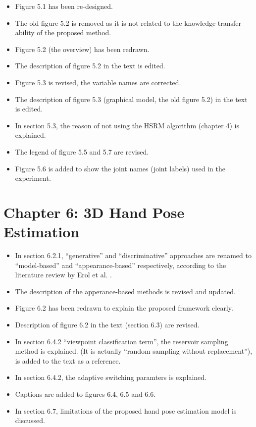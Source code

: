 \documentclass[10pt, a4paper]{article}
\begin{document}
\begin{itemize}
\item Figure 5.1 has been re-designed.
\item The old figure 5.2 is removed as it is not related to the knowledge transfer ability of the proposed method.
\item Figure 5.2 (the overview) has been redrawn.
\item The description of figure 5.2 in the text is edited.
\item Figure 5.3 is revised, the variable names are corrected.
\item The description of figure 5.3 (graphical model, the old figure 5.2) in the text is edited.
\item In section 5.3, the reason of not using the HSRM algorithm (chapter 4) is explained.
\item The legend of figure 5.5 and 5.7 are revised.
\item Figure 5.6 is added to show the joint names (joint labels) used in the experiment.
\end{itemize}

\section{Chapter 6: 3D Hand Pose Estimation} 

\begin{itemize}
\item In section 6.2.1, ``generative'' and ``discriminative'' approaches are renamed to ``model-based'' and ``appearance-based'' respectively, according to the literature review by Erol et al. \cite{Erol2007}.
\item The description of the apperance-based methods is revised and updated.  
\item Figure 6.2 has been redrawn to explain the proposed framework clearly.
\item Description of figure 6.2 in the text (section 6.3) are revised.
\item In section 6.4.2 ``viewpoint classification term'', the reservoir sampling method is explained. (It is actually ``random sampling without replacement''), \cite{Vitter1985} is added to the text as a reference.
\item In section 6.4.2, the adaptive switching paramters is explained. 
\item Captions are added to figures 6.4, 6.5 and 6.6.
\item In section 6.7, limitations of the proposed hand pose estimation model is discussed.
\end{itemize}
\end{document}
